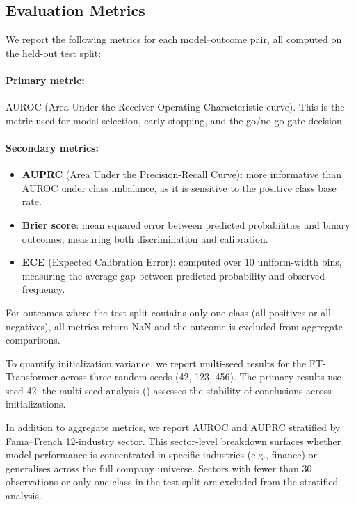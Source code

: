 \subsection{Evaluation Metrics}
\label{sec:metrics}

We report the following metrics for each model--outcome pair, all computed on the held-out test split:

\paragraph{Primary metric:} AUROC (Area Under the Receiver Operating Characteristic curve). This is the metric used for model selection, early stopping, and the go/no-go gate decision.

\paragraph{Secondary metrics:}
\begin{itemize}[leftmargin=*]
  \item \textbf{AUPRC} (Area Under the Precision-Recall Curve): more informative than AUROC under class imbalance, as it is sensitive to the positive class base rate.
  \item \textbf{Brier score}: mean squared error between predicted probabilities and binary outcomes, measuring both discrimination and calibration.
  \item \textbf{ECE} (Expected Calibration Error): computed over 10 uniform-width bins, measuring the average gap between predicted probability and observed frequency.
\end{itemize}

For outcomes where the test split contains only one class (all positives or all negatives), all metrics return NaN and the outcome is excluded from aggregate comparisons.

To quantify initialization variance, we report multi-seed results for the FT-Transformer across three random seeds (42, 123, 456). The primary results use seed 42; the multi-seed analysis () assesses the stability of conclusions across initializations.

In addition to aggregate metrics, we report AUROC and AUPRC stratified by Fama--French 12-industry sector. This sector-level breakdown surfaces whether model performance is concentrated in specific industries (e.g., finance) or generalises across the full company universe. Sectors with fewer than 30 observations or only one class in the test split are excluded from the stratified analysis.


